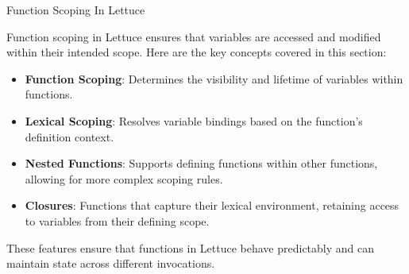 \begin{notes}{Function Scoping In Lettuce}
\begin{highlight}[Closures]
    \end{highlight}
    
    \begin{highlight}
    
        Function scoping in Lettuce ensures that variables are accessed and modified within their intended scope. Here are the key concepts covered in this section:
    
        \begin{itemize}
            \item \textbf{Function Scoping}: Determines the visibility and lifetime of variables within functions.
            \item \textbf{Lexical Scoping}: Resolves variable bindings based on the function's definition context.
            \item \textbf{Nested Functions}: Supports defining functions within other functions, allowing for more complex scoping rules.
            \item \textbf{Closures}: Functions that capture their lexical environment, retaining access to variables from their defining scope.
        \end{itemize}
    
        These features ensure that functions in Lettuce behave predictably and can maintain state across different invocations.
    
    \end{highlight}
\end{notes}